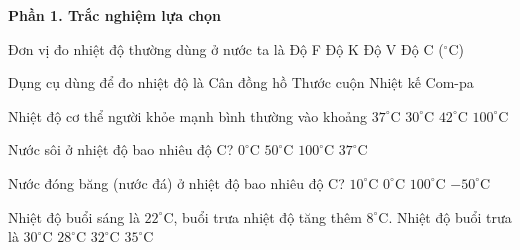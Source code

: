 \textbf{Phần 1. Trắc nghiệm lựa chọn}

\begin{ex} %
Đơn vị đo nhiệt độ thường dùng ở nước ta là
\choice
{Độ F}
{Độ K}
{Độ V}
{\True Độ C ($^\circ\text{C}$)}
\end{ex}

\begin{ex} %
Dụng cụ dùng để đo nhiệt độ là
\choice
{Cân đồng hồ}
{Thước cuộn}
{\True Nhiệt kế}
{Com-pa}
\end{ex}

\begin{ex} %
Nhiệt độ cơ thể người khỏe mạnh bình thường vào khoảng
\choice
{\True $37^\circ\text{C}$}
{$30^\circ\text{C}$}
{$42^\circ\text{C}$}
{$100^\circ\text{C}$}
\end{ex}

\begin{ex} %
Nước sôi ở nhiệt độ bao nhiêu độ C?
\choice
{$0^\circ\text{C}$}
{$50^\circ\text{C}$}
{\True $100^\circ\text{C}$}
{$37^\circ\text{C}$}
\end{ex}

\begin{ex} %
Nước đóng băng (nước đá) ở nhiệt độ bao nhiêu độ C?
\choice
{$10^\circ\text{C}$}
{\True $0^\circ\text{C}$}
{$100^\circ\text{C}$}
{$-50^\circ\text{C}$}
\end{ex}

\begin{ex} %
Nhiệt độ buổi sáng là $22^\circ\text{C}$, buổi trưa nhiệt độ tăng thêm $8^\circ\text{C}$. Nhiệt độ buổi trưa là
\choice
{\True $30^\circ\text{C}$}
{$28^\circ\text{C}$}
{$32^\circ\text{C}$}
{$35^\circ\text{C}$}
\end{ex}

